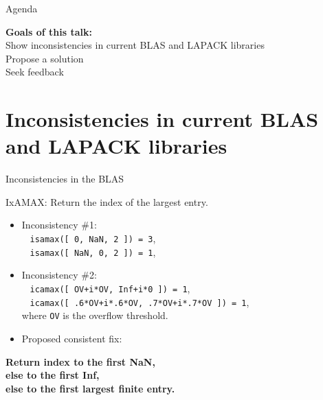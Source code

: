 \documentclass[11pt]{beamer}
\begin{document}
\begin{frame}{Agenda}

	\tableofcontents

	\begin{center}
		\textbf{Goals of this talk:}\\
	Show inconsistencies in current BLAS and LAPACK libraries\\
	Propose a solution\\
	Seek feedback
\end{center}

\end{frame}

\section{Inconsistencies in current BLAS and LAPACK libraries}

\begin{frame}{Inconsistencies in the BLAS}

	IxAMAX: Return the index of the largest entry.
	\begin{itemize}
		\item Inconsistency \#1:\\
		~ \texttt{isamax([ 0, NaN, 2 ]) = 3},\\
		~ \texttt{isamax([ NaN, 0, 2 ]) = 1},
		\item Inconsistency \#2:\\
		~ \texttt{icamax([ OV+i*OV, Inf+i*0 ]) = 1},\\
		~ \texttt{icamax([ .6*OV+i*.6*OV, .7*OV+i*.7*OV ]) = 1},\\
		where \texttt{OV} is the overflow threshold.
		\item Proposed consistent fix: 
	\end{itemize}

	\begin{center}
		\textbf{Return index to the first NaN,\\ else to the first Inf,\\ else to the first largest finite entry.}
	\end{center}
	

\end{frame}
\end{document}
